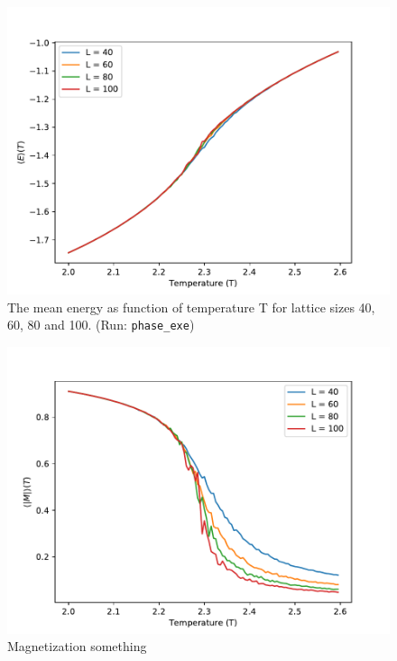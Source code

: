 \documentclass[12pt,english,a4paper]{article}
\begin{document}
\begin{figure}[H]
    \centering
    \includegraphics[scale=0.7]{Code_Files/Figures/E_of_T_N_1000000000.pdf}
    \caption{The mean energy as function of temperature T for lattice sizes 40, 60, 80 and 100. (Run: \texttt{phase\_exe})}
    \label{fig:E_of_T}
\end{figure}
\begin{figure}[H]
    \centering
    \includegraphics[scale=0.7]{Code_Files/Figures/M_of_T_N_1000000000.pdf}
    \caption{Magnetization something}
    \label{fig:M_of_T}
\end{figure}
\end{document}
